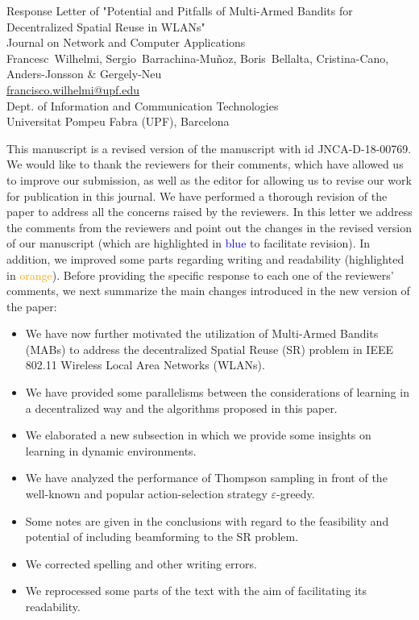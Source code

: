 \documentclass[a4paper,twoside,11pt]{reviewresponse}
\makeatletter
\newcommand{\myAuthors}{Francesc~Wilhelmi, Sergio~Barrachina-Mu\~noz, Boris~Bellalta, Cristina-Cano, Anders-Jonsson \& Gergely-Neu}
\newcommand{\myEmail}{francisco.wilhelmi@upf.edu}
\newcommand{\myTitle}{Response Letter of "Potential and Pitfalls of Multi-Armed Bandits for Decentralized Spatial Reuse in WLANs"}
\newcommand{\myJournal}{Journal on Network and Computer Applications}
\newcommand{\myDept}{Dept. of Information and Communication Technologies \\ Universitat Pompeu Fabra (UPF), Barcelona}
\makeatother
\begin{document}
	
	\thispagestyle{plain}
	
	\begin{center}
		{\LARGE\myTitle} \vspace{0.5cm} \\
		{\large\myJournal} \vspace{0.5cm} \\
		\myAuthors \\
		\url{\myEmail} \vspace{0.3cm} \\
		\myDept
	\end{center}
	
	\medskip
	
	\medskip
	
	This manuscript is a revised version of the manuscript with id JNCA-D-18-00769. We would like to thank the reviewers for their comments, which have allowed us to improve our submission, as well as the editor for allowing us to revise our work for publication in this journal. We have performed a thorough revision of the paper to address all the concerns raised by the reviewers. In this letter we address the comments from the reviewers and point out the changes in the revised version of our manuscript (which are highlighted in \textcolor{blue}{blue} to facilitate revision). In addition, we improved some parts regarding writing and readability (highlighted in \textcolor{orange}{orange}). Before providing the specific response to each one of the reviewers’ comments, we next summarize the main changes introduced in the new version of the paper:
    
    \begin{itemize}
        \item We have now further motivated the utilization of Multi-Armed Bandits (MABs) to address the decentralized Spatial Reuse (SR) problem in IEEE 802.11 Wireless Local Area Networks (WLANs).
        \item We have provided some parallelisms between the considerations of learning in a decentralized way and the algorithms proposed in this paper.
        \item We elaborated a new subsection in which we provide some insights on learning in dynamic environments.
        \item We have analyzed the performance of Thompson sampling in front of the well-known and popular action-selection strategy $\varepsilon$-greedy.
        \item Some notes are given in the conclusions with regard to the feasibility and potential of including beamforming to the SR problem.
        \item We corrected spelling and other writing errors.
        \item We reprocessed some parts of the text with the aim of facilitating its readability. 
    \end{itemize}
    
\end{document}
